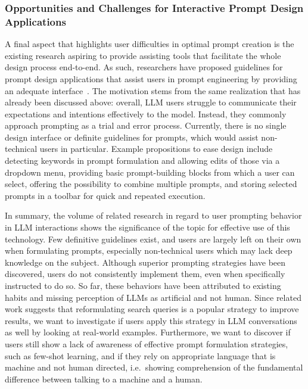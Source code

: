 \subsubsection{Opportunities and Challenges for Interactive Prompt Design Applications}
A final aspect that highlights user difficulties in optimal prompt creation is the existing
research aspiring to provide assisting tools that facilitate the whole design process end-to-end.
As such, researchers have proposed guidelines for prompt design applications that assist
users in prompt engineering by providing an adequate interface~\cite{dang_how_2022}.
The motivation stems from the same realization that has already been discussed above: overall,
LLM users struggle to communicate their expectations and intentions effectively to the model.
Instead, they commonly approach prompting as a trial and error process.
Currently, there is no single design interface or definite guidelines for prompts, which would
assist non-technical users in particular.
Example propositions to ease design include detecting keywords in prompt formulation and allowing
edits of those via a dropdown menu, providing basic prompt-building blocks from which a user can
select,
offering the possibility to combine multiple prompts, and storing selected prompts in a toolbar for
quick and repeated execution. %
\newline

In summary, the volume of related research in regard to user prompting behavior in LLM
interactions shows the significance of the topic for effective use of this technology.
Few definitive guidelines exist, and users are largely left on their own when formulating prompts,
especially non-technical users which may lack deep knowledge on the subject.
Although superior prompting strategies have been discovered, users do not consistently
implement them, even when specifically instructed to do so.
So far, these behaviors have been attributed to existing habits and missing perception of LLMs as
artificial and not human.
Since related work suggests that reformulating search queries is a popular strategy to improve
results, we want to investigate if users apply this strategy in LLM conversations as well by
looking at real-world examples. %
Furthermore, we want to discover if users still show a lack of awareness of effective prompt
formulation strategies, such as few-shot learning, and if they rely on appropriate language that
is machine and not human directed, i.e.\ showing comprehension of the fundamental difference
between talking to a machine and a human.
